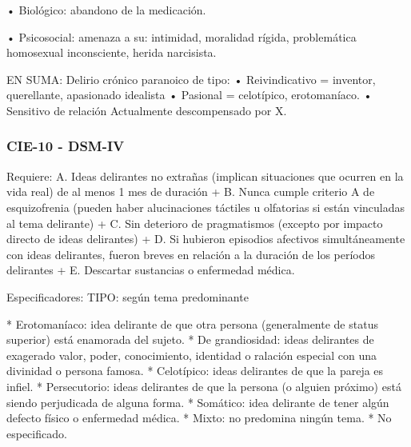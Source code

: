 • Biológico: abandono de la medicación.

• Psicosocial: amenaza a su: intimidad, moralidad rígida, problemática homosexual inconsciente, herida narcisista.

EN SUMA: Delirio crónico paranoico de tipo: • Reivindicativo = inventor, querellante, apasionado idealista • Pasional = celotípico, erotomaníaco. • Sensitivo de relación Actualmente descompensado por X.

\subsubsection*{CIE-10 - DSM-IV}
Requiere:
A. Ideas delirantes no extrañas (implican situaciones que ocurren en la vida real) de al menos 1 mes de duración +
B. Nunca cumple criterio A de esquizofrenia (pueden haber alucinaciones táctiles u olfatorias si están vinculadas al tema delirante) +
C. Sin deterioro de pragmatismos (excepto por impacto directo de ideas delirantes) +
D. Si hubieron episodios afectivos simultáneamente con ideas delirantes, fueron breves en relación a la duración de los períodos delirantes +
E. Descartar sustancias o enfermedad médica.

Especificadores: TIPO: según tema predominante

* Erotomaníaco: idea delirante de que otra persona (generalmente de status superior) está enamorada del sujeto.
* De grandiosidad: ideas delirantes de exagerado valor, poder, conocimiento, identidad o ralación especial con una divinidad o persona famosa.
* Celotípico: ideas delirantes de que la pareja es infiel.
* Persecutorio: ideas delirantes de que la persona (o alguien próximo) está siendo perjudicada de alguna forma.
* Somático: idea delirante de tener algún defecto físico o enfermedad médica.
* Mixto: no predomina ningún tema.
* No especificado.


